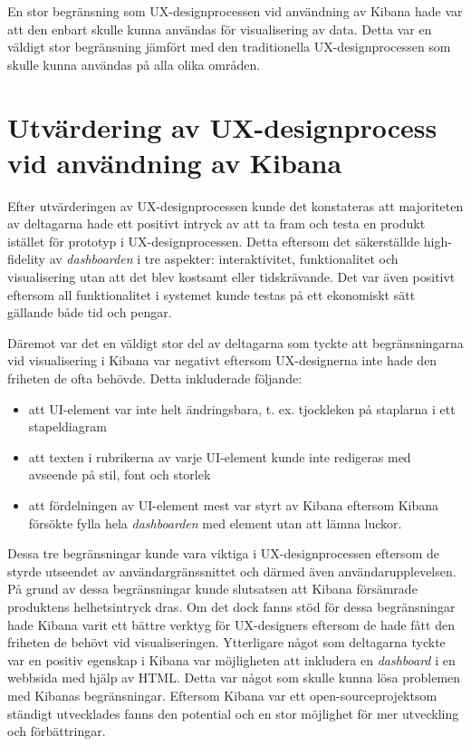 \documentclass[12pt]{kththesis}
\begin{document}
En stor begränsning som UX-designprocessen vid användning av Kibana hade var att den enbart skulle kunna användas för visualisering av data. Detta var en väldigt stor begränsning jämfört med den traditionella UX-designprocessen som skulle kunna användas på alla olika områden. 

\section{Utvärdering av UX-designprocess vid användning av Kibana}
Efter utvärderingen av UX-designprocessen kunde det konstateras att majoriteten av deltagarna hade ett positivt intryck av att ta fram och testa en produkt istället för prototyp i UX-designprocessen. Detta eftersom det säkerställde high-fidelity av \textit{dashboarden} i tre aspekter: interaktivitet, funktionalitet och visualisering utan att det blev kostsamt eller tidskrävande. Det var även positivt eftersom all funktionalitet i systemet kunde testas på ett ekonomiskt sätt gällande både tid och pengar. 

Däremot var det en väldigt stor del av deltagarna som tyckte att begränsningarna vid visualisering i Kibana var negativt eftersom UX-designerna inte hade den friheten de ofta behövde. Detta inkluderade följande: 
\begin{itemize}
\item att UI-element var inte helt ändringsbara, t. ex. tjockleken på staplarna i ett stapeldiagram
\item att texten i rubrikerna av varje UI-element kunde inte redigeras med avseende på stil, font och storlek
\item att fördelningen av UI-element mest var styrt av Kibana eftersom Kibana försökte fylla hela \textit{dashboarden} med element utan att lämna luckor. 
\end{itemize}

Dessa tre begränsningar kunde vara viktiga i UX-designprocessen eftersom de styrde utseendet av användargränssnittet och därmed även användarupplevelsen. På grund av dessa begränsningar kunde slutsatsen att Kibana försämrade produktens helhetsintryck dras. Om det dock fanns stöd för dessa begränsningar hade Kibana varit ett bättre verktyg för UX-designers eftersom de hade fått den friheten de behövt vid visualiseringen. Ytterligare något som deltagarna tyckte var en positiv egenskap i Kibana var möjligheten att inkludera en \textit{dashboard} i en webbsida med hjälp av HTML. Detta var något som skulle kunna lösa problemen med Kibanas begränsningar. Eftersom Kibana var ett open-sourceprojektsom ständigt utvecklades fanns den potential och en stor möjlighet för mer utveckling och förbättringar.
\end{document}
